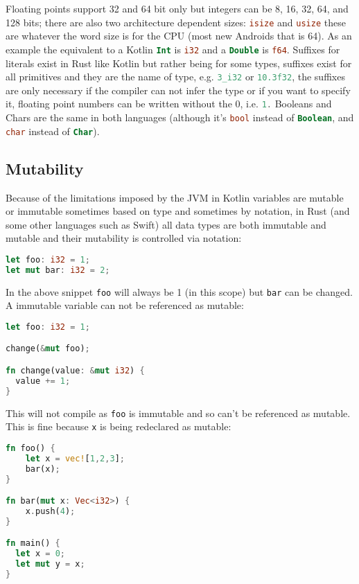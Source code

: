 \documentclass[a4paper,11pt]{article}
\begin{document}
\renewcommand{\arraystretch}{1}
Floating points support 32 and 64 bit only but integers can be 8, 16, 32, 64, and 128 bits; there are also two architecture dependent sizes: \lstinline[language=Rust]{isize} and \lstinline[language=Rust]{usize} these are whatever the word size is for the CPU (most new Androids that is 64). As an example the equivalent to a Kotlin \lstinline[language=Kotlin]{Int} is \lstinline[language=Rust]{i32} and a \lstinline[language=Kotlin]{Double} is \lstinline[language=Rust]{f64}. 
\newline
Suffixes for literals exist in Rust like Kotlin but rather being for some types, suffixes exist for all primitives and they are the name of type, e.g. \lstinline[language=Rust]{3_i32} or \lstinline[language=Rust]{10.3f32}, the suffixes are only necessary if the compiler can not infer the type or if you want to specify it, floating point numbers can be written without the 0, i.e. \lstinline[language=Rust]{1.}
\newline
Booleans and Chars are the same in both languages (although it's \lstinline[language=Rust]{bool} instead of \lstinline[language=Kotlin]{Boolean}, and \lstinline[language=Rust]{char} instead of \lstinline[language=Kotlin]{Char}).

\subsection{Mutability}
Because of the limitations imposed by the JVM in Kotlin variables are mutable or immutable sometimes based on type and sometimes by notation, in Rust (and some other languages such as Swift) all data types are both immutable and mutable and their mutability is controlled via notation:
\begin{lstlisting}[language=Rust,frame=single]
let foo: i32 = 1;
let mut bar: i32 = 2;
\end{lstlisting}
In the above snippet \lstinline{foo} will always be 1 (in this scope) but \lstinline{bar} can be changed. A immutable variable can not be referenced as mutable:
\begin{lstlisting}[language=Rust,frame=single,backgroundcolor=\color{palered}]
let foo: i32 = 1;

change(&mut foo);

fn change(value: &mut i32) {
  value += 1;
}
\end{lstlisting}
This will not compile as \lstinline{foo} is immutable and so can't be referenced as mutable.
\newline
This is fine because \lstinline{x} is being redeclared as mutable:
\begin{lstlisting}[language=Rust,frame=single]
fn foo() {
    let x = vec![1,2,3];
    bar(x);
}

fn bar(mut x: Vec<i32>) {
    x.push(4);
}

fn main() {
  let x = 0;
  let mut y = x;
}
\end{lstlisting}
\end{document}

